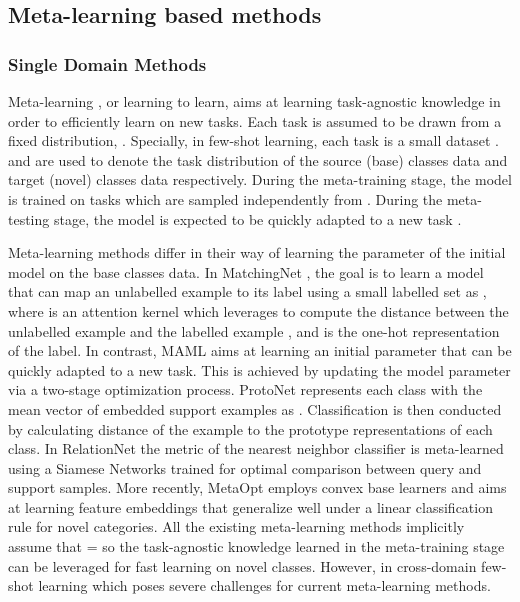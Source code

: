 \documentclass[runningheads]{llncs}
\begin{document}
\subsection{Meta-learning based methods}

\subsubsection{Single Domain Methods}
Meta-learning \cite{finn2017model,ravi2016optimization}, or learning to learn, aims at learning task-agnostic knowledge in order to efficiently learn on new tasks. Each task  is assumed to be drawn from a fixed distribution, . Specially, in few-shot learning, each task  is a small dataset .  and  are used to denote the task distribution of the source (base) classes data and target (novel) classes data respectively. During the meta-training stage, the model is trained on  tasks  which are sampled independently from . During the meta-testing stage, the model is expected to be quickly adapted to a new task .

Meta-learning methods differ in their way of learning the parameter of the initial model  on the base classes data. In MatchingNet \cite{vinyals2016matching}, the goal is to learn a model  that can map an unlabelled example  to its label  using a small labelled set  as , where  is an attention kernel which leverages  to compute the distance between the unlabelled example  and the labelled example , and  is the one-hot representation of the label. In contrast, MAML \cite{finn2017model} aims at learning an initial parameter  that can be quickly adapted to a new task. This is achieved by updating the model parameter via a two-stage optimization process. ProtoNet \cite{snell2017prototypical} represents each class  with the mean vector of embedded support examples as . Classification is then conducted by calculating distance of the example to the prototype representations of each class. In RelationNet \cite{sung2018learning} the metric of the nearest neighbor classifier is meta-learned using a Siamese Networks trained for optimal comparison between query and support samples. More recently, MetaOpt \cite{lee2019meta} employs convex base learners and aims at learning feature embeddings that generalize well under a linear classification rule for novel categories. All the existing meta-learning methods implicitly assume that  =  so the task-agnostic knowledge learned in the meta-training stage can be leveraged for fast learning on novel classes. However, in cross-domain few-shot learning    which poses severe challenges for current meta-learning methods.
\end{document}
